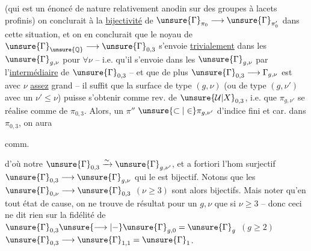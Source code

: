 (qui est un énoncé de nature relativement anodin sur des groupes à lacets profinis) on conclurait à la \uline{bijectivité} de $\unsure{\Gamma}_{\pi_0}\longrightarrow\unsure{\Gamma}_{\pi'_0}$ dans cette situation, et on en conclurait que le noyau de $\unsure{\Gamma}_{\unsure{\mathbb Q}}\longrightarrow\unsure{\Gamma}_{0,3}$  s'envoie \uline{trivialement} dans les $\unsure{\Gamma}_{g,\nu}$ pour $\forall\nu$ -- i.e. qu'il s'envoie dans les $\unsure{\Gamma}_{g,\nu}$ par l'\uline{intermédiaire} de $\unsure{\Gamma}_{0,3}$  -- et que de plus $\unsure{\Gamma}_{0,3}\longrightarrow\Gamma_{g,\nu}$ est
 avec $\nu$ \uline{assez} grand -- il suffit que la surface de type $(g,\nu)$  (ou de type $(g,\nu')$ avec un $\nu'\leq\nu$) puisse s'obtenir comme rev.  de $\unsure{\mathcal U|X}_{0,3}$, i.e. que $\pi_{g,\nu'}$ se réalise  comme     de $\pi_{0,3}$. Alors,   un $\pi''$  $\unsure{\subset|\in}\pi_{g,\nu'}$ d'indice fini et car. dans $\pi_{0,3}$, on aura

 comm.

d'où notre  $\unsure{\Gamma}_{0,3}\xrightarrow{\sim}\unsure{\Gamma}_{g,\nu'}$, et a fortiori l'hom surjectif $\unsure{\Gamma}_{0,3}\longrightarrow\unsure{\Gamma}_{g,\nu}$ qui le   est bijectif. Notons  que les $\unsure{\Gamma}_{0,\nu}\longrightarrow\unsure{\Gamma}_{0,3}$ $(\nu\geq3)$ sont alors bijectifs. Mais  noter qu'en tout état de cause, on ne trouve de résultat pour un $g,\nu$ que si $\nu\geq3$ -- donc ceci ne dit rien sur la fidélité   de $\unsure{\Gamma}_{0,3}\unsure{\longrightarrow|-}\unsure{\Gamma}_{g,0}=\unsure{\Gamma}_g$ $(g\geq2)$  $\unsure{\Gamma}_{0,3}\longrightarrow\unsure{\Gamma}_{1,1}=\unsure{\Gamma}_1$.

